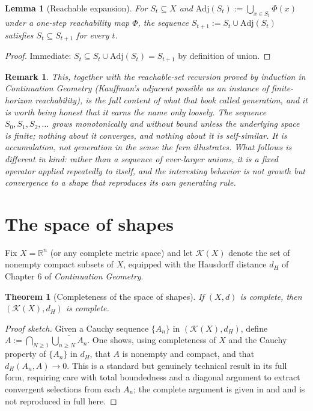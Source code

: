 \documentclass[11pt]{report}
\newtheorem{theorem}{Theorem}[chapter]
\newtheorem{lemma}{Lemma}[chapter]
\newtheorem{remark}{Remark}[chapter]
\begin{document}
\begin{lemma}[Reachable expansion]
For $S_t \subseteq X$ and $\mathrm{Adj}(S_t) := \bigcup_{x \in S_t} \Phi(x)$
under a one-step reachability map $\Phi$, the sequence
$S_{t+1} := S_t \cup \mathrm{Adj}(S_t)$ satisfies $S_t \subseteq S_{t+1}$
for every $t$.
\end{lemma}
\begin{proof}
Immediate: $S_t \subseteq S_t \cup \mathrm{Adj}(S_t) = S_{t+1}$ by
definition of union.
\end{proof}

\begin{remark}
This, together with the reachable-set recursion proved by induction
in \emph{Continuation Geometry} (Kauffman's adjacent possible as an
instance of finite-horizon reachability), is the full content of what
that book called generation, and it is worth being honest that it
earns the name only loosely. The sequence $S_0, S_1, S_2, \dots$ grows
monotonically and without bound unless the underlying space is
finite; nothing about it converges, and nothing about it is
self-similar. It is accumulation, not generation in the sense the
fern illustrates. What follows is different in kind: rather than a
sequence of ever-larger unions, it is a fixed operator applied
repeatedly to itself, and the interesting behavior is not growth but
convergence to a shape that reproduces its own generating rule.
\end{remark}

\section*{The space of shapes}

Fix $X = \mathbb{R}^n$ (or any complete metric space) and let
$\mathcal{K}(X)$ denote the set of nonempty compact subsets of $X$,
equipped with the Hausdorff distance $d_H$ of Chapter 6 of
\emph{Continuation Geometry}.

\begin{theorem}[Completeness of the space of shapes]
\label{thm:complete}
If $(X,d)$ is complete, then $(\mathcal{K}(X), d_H)$ is complete.
\end{theorem}
\begin{proof}[Proof sketch]
Given a Cauchy sequence $\{A_n\}$ in $(\mathcal{K}(X), d_H)$, define
$A := \bigcap_{N \geq 1} \overline{\bigcup_{n \geq N} A_n}$. One shows,
using completeness of $X$ and the Cauchy property of $\{A_n\}$ in
$d_H$, that $A$ is nonempty and compact, and that $d_H(A_n, A) \to 0$.
This is a standard but genuinely technical result in its full form,
requiring care with total boundedness and a diagonal argument to
extract convergent selections from each $A_n$; the complete argument
is given in \cite{falconer2003} and \cite{barnsley1988} and is not
reproduced in full here.
\end{proof}
\end{document}
